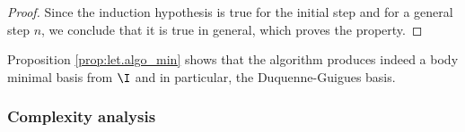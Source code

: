 \begin{proof}
\vspace{1.2em}

Since the induction hypothesis is true for the initial step and for a general 
step $n$, we conclude that it is true in general, which proves the property.

\end{proof} 

Proposition \ref{prop:let.algo_min} shows that the algorithm produces indeed a 
body minimal basis from $\I$ and in particular, the Duquenne-Guigues basis. 

\subsubsection{Complexity analysis}


